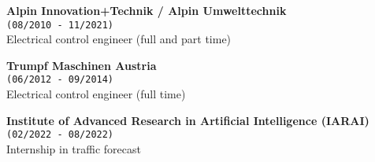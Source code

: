 

\textbf{Alpin Innovation+Technik / Alpin Umwelttechnik}\\
\texttt{(08/2010 - 11/2021)}\\
Electrical control engineer (full and part time)

\textbf{Trumpf Maschinen Austria}\\
\texttt{(06/2012 - 09/2014)}\\
Electrical control engineer (full time)

\textbf{Institute of Advanced Research in Artificial Intelligence (IARAI)}\\
\texttt{(02/2022 - 08/2022)}\\
Internship in traffic forecast